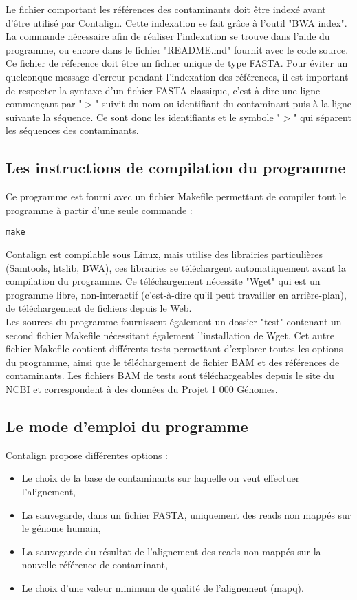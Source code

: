 \documentclass[a4paper,12pt]{article}
\begin{document}
Le fichier comportant les références des contaminants doit être indexé avant d'être utilisé par Contalign. Cette indexation se fait grâce à l'outil "BWA index". La commande nécessaire afin de réaliser l'indexation se trouve dans l'aide du programme, ou encore dans le fichier "README.md" fournit avec le code source. Ce fichier de réference doit être un fichier unique de type FASTA. Pour éviter un quelconque message d'erreur pendant l'indexation des références, il est important de respecter la syntaxe d'un fichier FASTA classique, c'est-à-dire une ligne commençant par "$>$" suivit du nom ou identifiant du contaminant puis à la ligne suivante la séquence. Ce sont donc les identifiants et le symbole "$>$" qui séparent les séquences des contaminants.
\\
\subsection{Les instructions de compilation du programme}
Ce programme est fourni avec un fichier Makefile permettant de compiler tout le programme à partir d'une seule commande :

\lstset{language=C, basicstyle=\small\ttfamily, breaklines,prebreak= , postbreak= , frame=shadowbox}
\begin{lstlisting} 
make 
\end{lstlisting} 
Contalign est compilable sous Linux, mais utilise des librairies particulières (Samtools, htslib, BWA), ces librairies se téléchargent automatiquement avant la compilation du programme. Ce téléchargement nécessite "Wget" qui est un programme libre, non-interactif (c'est-à-dire qu'il peut travailler en arrière-plan), de téléchargement de fichiers depuis le Web. \\ Les sources du programme fournissent également un dossier "test" contenant un second fichier Makefile nécessitant également l'installation de Wget. Cet autre fichier Makefile contient différents tests permettant d'explorer toutes les options du programme, ainsi que le téléchargement de fichier BAM et des références de contaminants. Les fichiers BAM de tests sont téléchargeables depuis le site du NCBI et correspondent à des données du Projet 1 000 Génomes. 
\subsection{Le mode d'emploi du programme}

Contalign propose différentes options  :
\begin{itemize}
\item Le choix de la base de contaminants sur laquelle on veut effectuer l'alignement,
\item La sauvegarde, dans un fichier FASTA, uniquement des reads non mappés sur le génome humain,
\item La sauvegarde du résultat de l'alignement des reads non mappés sur la nouvelle référence de contaminant,
\item Le choix d'une valeur minimum de qualité de l'alignement (mapq).
\end{itemize}
\end{document}
